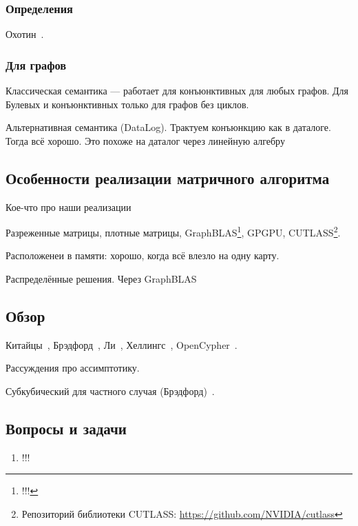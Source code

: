 \subsubsection{Определения}

Охотин~\cite{!!!}.

\subsubsection{Для графов}

Классическая семантика --- работает для конъюнктивных для любых графов.
Для Булевых и конъюнктивных только для графов без циклов.

Альтернативная семантика (DataLog).
Трактуем конъюнкцию как в даталоге. Тогда всё хорошо.
Это похоже на даталог через линейную алгебру~\cite{!!!}

\subsection{Особенности реализации матричного алгоритма}

Кое-что про наши реализации~\cite{Mishin:2019:ECP:3327964.3328503}

Разреженные матрицы, плотные матрицы, GraphBLAS\footnote{!!!}, GPGPU, CUTLASS\footnote{Репозиторий библиотеки CUTLASS: \url{https://github.com/NVIDIA/cutlass}}.

Расположенеи в памяти: хорошо, когда всё влезло на одну карту.

Распределённые решения. 
Через GraphBLAS

\subsection{Обзор}

Китайцы~\cite{!!!}, Брэдфорд~\cite{!!!}, Ли~\cite{!!!}, Хеллингс~\cite{!!!}, OpenCypher~\cite{Kuijpers:2019:ESC:3335783.3335791}.


Рассуждения про ассимптотику.

Субкубический для частного случая (Брэдфорд)~\cite{8249039}.

\subsection{Вопросы и задачи}
\begin{enumerate}
  \item !!!
\end{enumerate}
